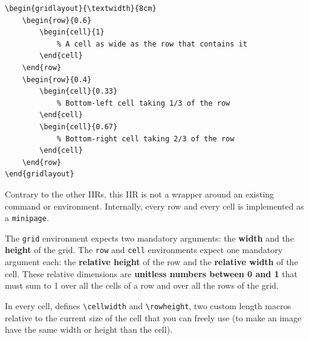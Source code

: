 \documentclass[11pt, a4paper]{article}
\begin{document}
\begin{lstlisting}[style=custom-latex]
% this grid is as wide as the text (\textwidth) and 8cm tall
\begin{gridlayout}{\textwidth}{8cm}
    \begin{row}{0.6}
        \begin{cell}{1}
            % A cell as wide as the row that contains it
        \end{cell}
    \end{row}
    \begin{row}{0.4}
        \begin{cell}{0.33}
            % Bottom-left cell taking 1/3 of the row
        \end{cell}
        \begin{cell}{0.67}
            % Bottom-right cell taking 2/3 of the row
        \end{cell}
    \end{row}
\end{gridlayout}
\end{lstlisting}

Contrary to the other IIRs, this IIR is not a wrapper around an existing command or environment.
Internally, every row and every cell is implemented as a \texttt{minipage}.

The \texttt{grid} environment expects two mandatory arguments: the \textbf{width} and the \textbf{height} of the grid.
The \texttt{row} and \texttt{cell} environments expect one mandatory argument each: the \textbf{relative height} of the row and the \textbf{relative width} of the cell. These relative dimensions are \textbf{unitless numbers between 0 and 1} that must sum to 1 over all the cells of a row and over all the rows of the grid.


\begin{info}
    In every cell, \iLaTeX{} defines \verb|\cellwidth| and \verb|\rowheight|, two custom length macros relative to the current size of the cell that you can freely use (\eg to make an image have the same width or height than the cell).
\end{info}
\end{document}
